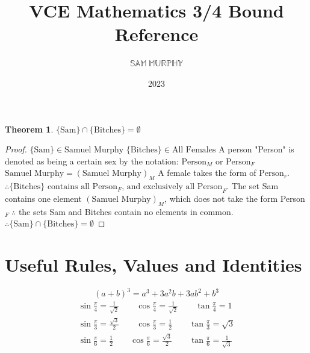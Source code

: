 \documentclass[a4paper,twoside,10pt]{article}
\title {VCE Mathematics 3/4 Bound Reference}
\author {$\mathbb{SAM}\;\mathbb{MURPHY}$}
\date{2023}
\begin{document}
	\large
	\maketitle
	\newtheorem{bitchesTheorem}{Theorem}
	\begin{bitchesTheorem}
		$\{\text{Sam}\}\cap\{\text{Bitches}\}=\emptyset$
	\end{bitchesTheorem}
	\begin{proof}
		$\{\text{Sam}\}\in\text{Samuel Murphy}$\newline
		$\{\text{Bitches}\}\in\text{All Females}$\newline\newline
		A person "Person" is denoted as being a certain sex by the notation: $\text{Person}_M\text{ or Person}_F$\newline\newline
		$\text{Samuel Murphy}=(\text{Samuel Murphy})_M$\newline\newline
		A female takes the form of $\text{Person}_r$. $\therefore \{\text{Bitches}\}\text{ contains all Person}_F\text{, and exclusively all Person}_F$.\newline\newline
		The set {Sam} contains one element $(\text{Samuel Murphy})_M$, which does not take the form Person$_F\;\therefore$ the sets {Sam} and {Bitches} contain no elements in common.\newline
		$\therefore\{\text{Sam}\}\cap\{\text{Bitches}\}=\emptyset$
	\end{proof}
	\newpage
	
	
	
	\small
	\tableofcontents
	\newpage
	\section{Useful Rules, Values and Identities}
	\[
		(a+b)^3=a^3+3a^2b+3ab^2+b^3
	\]
	\begin{align*}
		\sin\frac{\pi}{4}=\frac{1}{\sqrt2} \qquad \cos\frac{\pi}{4}=\frac{1}{\sqrt2} \qquad \tan\frac{\pi}{4}=1 \\
		\sin\frac{\pi}{3}=\frac{\sqrt3}{2} \qquad \cos\frac{\pi}{3}=\frac{1}{2} \qquad \tan\frac{\pi}{3}=\sqrt3\\
		\sin\frac{\pi}{6}=\frac{1}{2} \qquad \cos\frac{\pi}{6}=\frac{\sqrt3}{2} \qquad \tan\frac{\pi}{6}=\frac{1}{\sqrt3}
	\end{align*}
\end{document}
